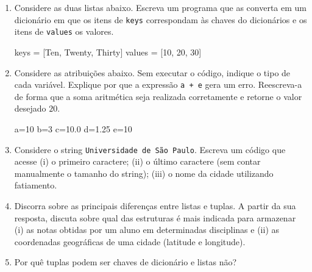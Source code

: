 \documentclass[
  brazilian,
  letterpaper,
  DIV=11,
  numbers=noendperiod]{scrreprt}
\newenvironment{Shaded}{\begin{snugshade}}{\end{snugshade}}
\newcommand{\DecValTok}[1]{\textcolor[rgb]{0.68,0.00,0.00}{#1}}
\newcommand{\FloatTok}[1]{\textcolor[rgb]{0.68,0.00,0.00}{#1}}
\newcommand{\NormalTok}[1]{\textcolor[rgb]{0.00,0.23,0.31}{#1}}
\newcommand{\OperatorTok}[1]{\textcolor[rgb]{0.37,0.37,0.37}{#1}}
\newcommand{\StringTok}[1]{\textcolor[rgb]{0.13,0.47,0.30}{#1}}
\begin{document}
\begin{enumerate}
\def\labelenumi{\arabic{enumi}.}
\item
  Considere as duas listas abaixo. Escreva um programa que as converta
  em um dicionário em que os itens de \texttt{keys} correspondam às
  chaves do dicionários e os itens de \texttt{values} os valores.

\begin{Shaded}
\begin{Highlighting}[]
\NormalTok{keys }\OperatorTok{=}\NormalTok{ [}\StringTok{\textquotesingle{}Ten\textquotesingle{}}\NormalTok{, }\StringTok{\textquotesingle{}Twenty\textquotesingle{}}\NormalTok{, }\StringTok{\textquotesingle{}Thirty\textquotesingle{}}\NormalTok{]}
\NormalTok{values }\OperatorTok{=}\NormalTok{ [}\DecValTok{10}\NormalTok{, }\DecValTok{20}\NormalTok{, }\DecValTok{30}\NormalTok{]}
\end{Highlighting}
\end{Shaded}
\item
  Considere as atribuições abaixo. Sem executar o código, indique o tipo
  de cada variável. Explique por que a expressão \texttt{a\ +\ e} gera
  um erro. Reescreva-a de forma que a soma aritmética seja realizada
  corretamente e retorne o valor desejado \(20\).

\begin{Shaded}
\begin{Highlighting}[]
\NormalTok{a}\OperatorTok{=}\DecValTok{10}
\NormalTok{b}\OperatorTok{=}\DecValTok{3}
\NormalTok{c}\OperatorTok{=}\FloatTok{10.0}
\NormalTok{d}\OperatorTok{=}\FloatTok{1.25}
\NormalTok{e}\OperatorTok{=}\StringTok{\textquotesingle{}10\textquotesingle{}}
\end{Highlighting}
\end{Shaded}
\item
  Considere o string \texttt{Universidade\ de\ São\ Paulo}. Escreva um
  código que acesse (i) o primeiro caractere; (ii) o último caractere
  (sem contar manualmente o tamanho do string); (iii) o nome da cidade
  utilizando fatiamento.
\item
  Discorra sobre as principais diferenças entre listas e tuplas. A
  partir da sua resposta, discuta sobre qual das estruturas é mais
  indicada para armazenar (i) as notas obtidas por um aluno em
  determinadas disciplinas e (ii) as coordenadas geográficas de uma
  cidade (latitude e longitude).
\item
  Por quê tuplas podem ser chaves de dicionário e listas não?
\end{enumerate}
\end{document}
